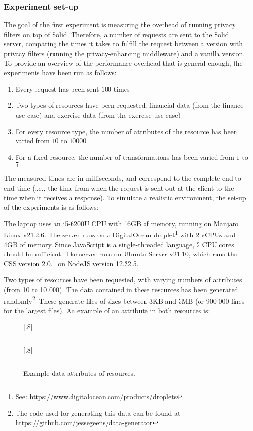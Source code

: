 \subsubsection{Experiment set-up}
The goal of the first experiment is measuring the overhead of running privacy filters on top of Solid. Therefore, a number of requests are sent to the Solid server, comparing the times it takes to fulfill the request between a version with privacy filters (running the privacy-enhancing middleware) and a vanilla version. To provide an overview of the performance overhead that is general enough, the experiments have been run as follows:
\begin{enumerate}
    \item Every request has been sent $100$ times
    \item Two types of resources have been requested, financial data (from the finance use case) and exercise data (from the exercise use case)
    \item For every resource type, the number of attributes of the resource has been varied from $10$ to $10 000$
    \item For a fixed resource, the number of transformations has been varied from $1$ to $7$
\end{enumerate}

\noindent The measured times are in milliseconds, and correspond to the complete end-to-end time (i.e., the time from when the request is sent out at the client to the time when it receives a response). To simulate a realistic environment, the set-up of the experiments is as follows:

\noindent 

\noindent The laptop uses an i5-6200U CPU with 16GB of memory, running on Manjaro Linux v21.2.6. The server runs on a DigitalOcean droplet\footnote{See: \url{https://www.digitalocean.com/products/droplets}} with 2 vCPUs and 4GB of memory. Since JavaScript is a single-threaded language, 2 CPU cores should be sufficient. The server runs on Ubuntu Server v21.10, which runs the \acrlong{CSS} version 2.0.1 on NodeJS version 12.22.5.

Two types of resources have been requested, with varying numbers of attributes (from 10 to 10 000). The data contained in these resources has been generated randomly\footnote{The code used for generating this data can be found at \url{https://github.com/jessegeens/data-generator}}. These generate files of sizes between 3KB and 3MB (or 900 000 lines for the largest files). An example of an attribute in both resources is:
\begin{figure}[H]
\centering
{}%
  [.8\textwidth]{\inputminted[linenos,tabsize=2,breaklines]{json}{code/ex-attr-txdata.json}}
  [.8\textwidth]{ \inputminted[linenos,tabsize=2]{xml}{code/ex-attr-tcx.xml}}
\caption{Example data attributes of resources.}
\label{fig:example-attributes}
\end{figure}

